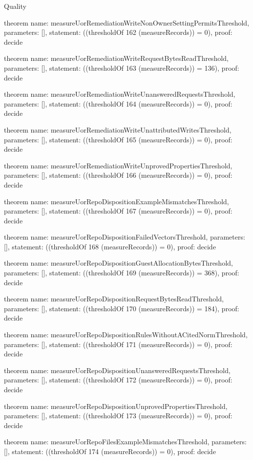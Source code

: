 \begin{lexlean}{Quality}
\begin{semanticmodule}
theorem{
  name: measureUorRemediationWriteNonOwnerSettingPermitsThreshold,
  parameters: [],
  statement: ((thresholdOf 162 (measureRecords)) = 0),
  proof: decide{}
}

theorem{
  name: measureUorRemediationWriteRequestBytesReadThreshold,
  parameters: [],
  statement: ((thresholdOf 163 (measureRecords)) = 136),
  proof: decide{}
}

theorem{
  name: measureUorRemediationWriteUnansweredRequestsThreshold,
  parameters: [],
  statement: ((thresholdOf 164 (measureRecords)) = 0),
  proof: decide{}
}

theorem{
  name: measureUorRemediationWriteUnattributedWritesThreshold,
  parameters: [],
  statement: ((thresholdOf 165 (measureRecords)) = 0),
  proof: decide{}
}

theorem{
  name: measureUorRemediationWriteUnprovedPropertiesThreshold,
  parameters: [],
  statement: ((thresholdOf 166 (measureRecords)) = 0),
  proof: decide{}
}

theorem{
  name: measureUorRepoDispositionExampleMismatchesThreshold,
  parameters: [],
  statement: ((thresholdOf 167 (measureRecords)) = 0),
  proof: decide{}
}

theorem{
  name: measureUorRepoDispositionFailedVectorsThreshold,
  parameters: [],
  statement: ((thresholdOf 168 (measureRecords)) = 0),
  proof: decide{}
}

theorem{
  name: measureUorRepoDispositionGuestAllocationBytesThreshold,
  parameters: [],
  statement: ((thresholdOf 169 (measureRecords)) = 368),
  proof: decide{}
}

theorem{
  name: measureUorRepoDispositionRequestBytesReadThreshold,
  parameters: [],
  statement: ((thresholdOf 170 (measureRecords)) = 184),
  proof: decide{}
}

theorem{
  name: measureUorRepoDispositionRulesWithoutACitedNormThreshold,
  parameters: [],
  statement: ((thresholdOf 171 (measureRecords)) = 0),
  proof: decide{}
}

theorem{
  name: measureUorRepoDispositionUnansweredRequestsThreshold,
  parameters: [],
  statement: ((thresholdOf 172 (measureRecords)) = 0),
  proof: decide{}
}

theorem{
  name: measureUorRepoDispositionUnprovedPropertiesThreshold,
  parameters: [],
  statement: ((thresholdOf 173 (measureRecords)) = 0),
  proof: decide{}
}

theorem{
  name: measureUorRepoFilesExampleMismatchesThreshold,
  parameters: [],
  statement: ((thresholdOf 174 (measureRecords)) = 0),
  proof: decide{}
}


\end{semanticmodule}
\end{lexlean}
